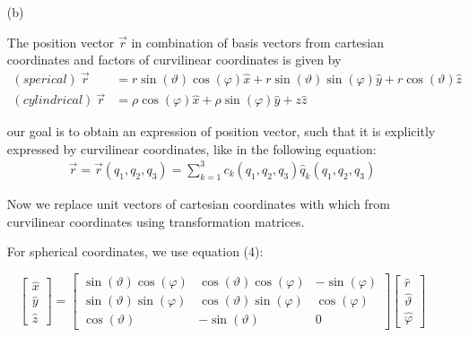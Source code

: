 \documentclass[11pt,a4paper]{article}
\begin{document}
\begin{enumerate}
\item[(b)]

The position vector $\vec{r}$ in combination of basis vectors from cartesian coordinates and factors of curvilinear coordinates is given by
\begin{align}
(sperical)\ \vec{r}&=r\sin(\vartheta)\cos(\varphi)\hat{x}+r\sin(\vartheta)\sin(\varphi)\hat{y}+r\cos(\vartheta)\hat{z}\\
(cylindrical)\ \vec{r}&=\rho\cos(\varphi)\hat{x}+\rho\sin(\varphi)\hat{y}+z\hat{z}
\end{align}

our goal is to obtain an expression of position vector, such that it is explicitly expressed by curvilinear coordinates, like in the following equation:
\begin{align*}
\vec{r}=\vec{r}(q_1,q_2,q_3)=\sum_{k=1}^3c_k(q_1,q_2,q_3)\hat{q}_k(q_1,q_2,q_3)
\end{align*}

Now we replace unit vectors of cartesian coordinates with which from curvilinear coordinates using transformation matrices.

For spherical coordinates, we use equation (4):

\begin{equation*}
\begin{bmatrix}
\hat{x} \\
\hat{y} \\
\hat{z}
\end{bmatrix}
=
\begin{bmatrix}
\sin(\vartheta)\cos(\varphi) & \cos(\vartheta)\cos(\varphi) & -\sin(\varphi) \\
\sin(\vartheta)\sin(\varphi) & \cos(\vartheta)\sin(\varphi) & \cos(\varphi) \\
\cos(\vartheta) & -\sin(\vartheta) & 0
\end{bmatrix}
\begin{bmatrix}
\hat{r} \\
\hat{\vartheta} \\
\hat{\varphi}
\end{bmatrix}
\end{equation*}


\end{enumerate}
\end{document}
